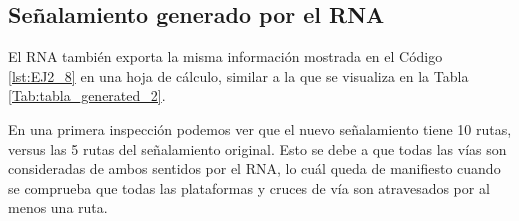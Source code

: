 \subsection{Señalamiento generado por el RNA}

     El RNA también exporta la misma información mostrada en el Código \ref{lst:EJ2_8} en una hoja de cálculo, similar a la que se visualiza en la Tabla \ref{Tab:tabla_generated_2}.
    
    \begin{table}[H]
        {
        \caption{Tabla de enclavamiento del ejemplo 2 generada por el RNA.}
        \label{Tab:tabla_generated_2}
        \centering
     }
    \end{table}
    
    En una primera inspección podemos ver que el nuevo señalamiento tiene 10 rutas, versus las 5 rutas del señalamiento original. Esto se debe a que todas las vías son consideradas de ambos sentidos por el RNA, lo cuál queda de manifiesto cuando se comprueba que todas las plataformas y cruces de vía son atravesados por al menos una ruta. 